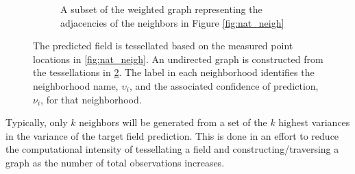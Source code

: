\begin{figure}[thpb]
\begin{subfigure}[b]{\textwidth}

        \captionsetup{skip=0.5\baselineskip,size=footnotesize}
        \caption{A subset of the weighted graph representing the adjacencies of the neighbors in Figure \ref{fig:nat_neigh}}
        \label{fig:neigh_graph}
  \end{subfigure}
  \captionsetup{skip=0.5\baselineskip,size=small}
  \caption{The predicted field is tessellated based on the measured point locations in \ref{fig:nat_neigh}. An undirected graph is constructed from the tessellations in \ref{fig:neigh_graph}. The label in each neighborhood identifies the neighborhood name, $\upsilon_i$, and the associated confidence of prediction, $\nu_i$, for that neighborhood.}
\end{figure}

Typically, only $k$ neighbors will be generated from a set of the $k$ highest variances in the variance of the target field prediction. This is done in an effort to reduce the computational intensity of tessellating a field and constructing/traversing a graph as the number of total observations increases.